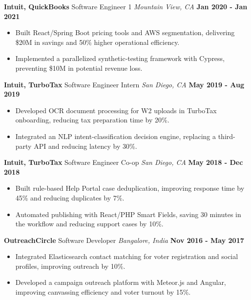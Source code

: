 \documentclass[10pt, letterpaper]{article}
\newcommand{\jobentry}[4]{
  \noindent\textbf{#1} \hfill #2 \hfill \textit{#3} \hfill \textbf{#4}
}
\begin{document}
\jobentry{Intuit, QuickBooks}{Software Engineer 1}{Mountain View, CA}{Jan 2020 - Jan 2021}
\begin{itemize}
	\item Built React/Spring Boot pricing tools and AWS segmentation, delivering \$20M in savings and 50\% higher operational efficiency.
	\item Implemented a parallelized synthetic-testing framework with Cypress, preventing \$10M in potential revenue loss.
\end{itemize}

\jobentry{Intuit, TurboTax}{Software Engineer Intern}{San Diego, CA}{May 2019 - Aug 2019}
\begin{itemize}
	\item Developed OCR document processing for W2 uploads in TurboTax onboarding, reducing tax preparation time by 20\%.
	\item Integrated an NLP intent-classification decision engine, replacing a third-party API and reducing latency by 30\%.
\end{itemize}

\jobentry{Intuit, TurboTax}{Software Engineer Co-op}{San Diego, CA}{May 2018 - Dec 2018}
\begin{itemize}
	\item Built rule-based Help Portal case deduplication, improving response time by 45\% and reducing duplicates by 7\%.
	\item Automated publishing with React/PHP Smart Fields, saving 30 minutes in the workflow and reducing support cases by 10\%.
\end{itemize}

\jobentry{OutreachCircle}{Software Developer}{Bangalore, India}{Nov 2016 - May 2017}
\begin{itemize}
	\item Integrated Elasticsearch contact matching for voter registration and social profiles, improving outreach by 10\%.
	\item Developed a campaign outreach platform with Meteor.js and Angular, improving canvassing efficiency and voter turnout by 15\%.
\end{itemize}

\end{document}
